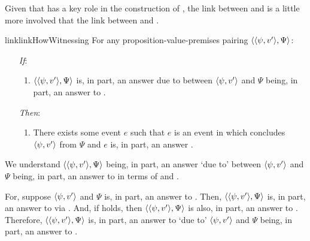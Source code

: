 \begin{note}
  Given that \qWhyV{} has a key role in the construction of \qHowV{}, the link between \qHow{} and \qHowV{} is a little more involved that the link between \qWhyV{} and \qWhy{}.

  \begin{restatable}{link}{linkHowWitnessing}
    \label{link:how-witnessing}
    For any proposition-value-premises pairing \(\langle \langle \psi, v' \rangle, \Psi \rangle\):
    \begin{itemize}
    \item[\emph{If}:]
      \begin{enumerate}[label=\alph*., ref=(\alph*)]
      \item
        \(\langle \langle \psi, v' \rangle, \Psi \rangle\) is, in part, an answer \qHow{} due to \ros{} between \(\langle \psi, v' \rangle\) and \(\Psi\) being, in part, an answer to \qWhyV{}.
      \end{enumerate}
    \item[\emph{Then}:]
      \begin{enumerate}[label=\alph*., ref=(\alph*), resume]
      \item
        There exists some event \(e\) such that \(e\) is an event in which \vAgent{} concludes \(\langle \psi, v' \rangle\) from \(\Psi\) and \(e\) is, in part, an answer \qHowV{}.
      \end{enumerate}
    \end{itemize}
    \vspace{-\baselineskip}
  \end{restatable}

  We understand  \(\langle \langle \psi, v' \rangle, \Psi \rangle\) being, in part, an answer \qHow{} `due to' \ros{} between \(\langle \psi, v' \rangle\) and \(\Psi\) being, in part, an answer to \qWhyV{} in terms of \linkW{} and \issueInclusion{}.

  For, suppose \(\langle \psi, v' \rangle\) and \(\Psi\) is, in part, an answer to \qWhyV{}.
  Then, \(\langle \langle \psi, v' \rangle, \Psi \rangle\) is, in part, an answer to \qWhy{} via \linkW{}.
  And, if \issueInclusion{} holds, then \(\langle \langle \psi, v' \rangle, \Psi \rangle\) is also, in part, an answer to \qHow{}.
  Therefore, \(\langle \langle \psi, v' \rangle, \Psi \rangle\) is, in part, an answer to \qHow{} `due to' \(\langle \psi, v' \rangle\) and \(\Psi\) being, in part, an answer to \qWhyV{}.
\end{note}

